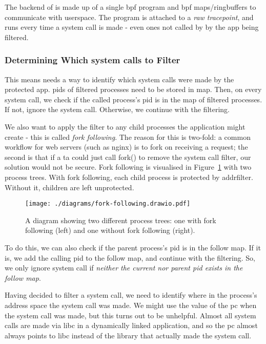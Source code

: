 The backend of \af is made up of a single \ac{bpf} program and \ac{bpf}
maps/ringbuffers to communicate with userspace.
The program is attached to a \textit{raw tracepoint}, and runs every time
a system call is made - even ones not called by by the app being filtered.

\subsubsection{Determining Which system calls to
Filter}\label{subsec:design-fork-following}

This means \af needs a way to identify which system calls were made by the
protected app. \acp{pid} of filtered processes
need to be stored in  map. Then, on every system call, we check if the
called process's \ac{pid} is in the map of filtered processes. If not, ignore
the system call. Otherwise, we continue with the filtering.

We also want to apply the filter to any child processes the
application might create - this is called \textit{fork following}. The reason for this is two-fold: a common workflow for
web servers (such as nginx) \cite{apache-prefork-2.4, nginx-inside-performance-scale-2015} is to fork on receiving a request; the second is
that if a \ac{ta} could just call fork() to remove the system call filter, our
solution would not be secure. Fork following is visualised in
Figure~\ref{fig:fork-follow-process-tree} with two process trees. With fork
following, each child process is protected by addrfilter. Without it, children
are left unprotected.

\begin{figure}[ht]
    \centering
    \texttt{[image: ./diagrams/fork-following.drawio.pdf]} 
    \caption{A diagram showing two different process trees: one with fork
    following (left) and one without fork following (right).}
    \label{fig:fork-follow-process-tree}
\end{figure}


To do this, we can also check if the parent process's \ac{pid} is in the follow
map. If it is, we add the calling \ac{pid} to the follow map, and continue with
the filtering. So, we only ignore system call if \textit{neither the current nor
parent \ac{pid} exists in the follow map}.

Having decided to filter a system call, we need to identify where in the process's
address space the system call was made. We might use the value of the \ac{pc} when
the system call was made, but this turns out to be unhelpful.
Almost all system calls are made via \ac{libc} in a dynamically linked 
application, and so the \ac{pc} almost always points to \ac{libc} instead of the
library that actually made the system call.

